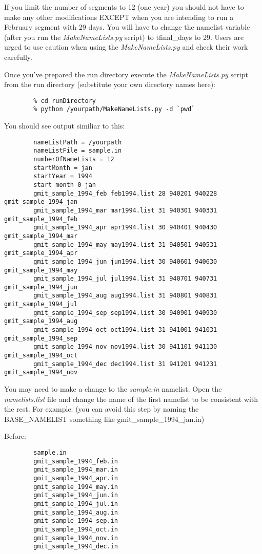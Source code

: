\begin{remark}
If you limit the number of segments to 12 (one year) you should not have to make any other
modifications EXCEPT when you are intending to run a February segment with 29 days. You will have to change the namelist variable (after you run
the {\em MakeNameLists.py} script) to tfinal\_days to 29.  Users are urged to use caution when using the {\em MakeNameLists.py} and check their work carefully.
\end{remark}

Once you've prepared the run directory execute the {\em MakeNameLists.py} script from the run directory (substitute your own directory names here):
\begin{verbatim}
        % cd runDirectory
        % python /yourpath/MakeNameLists.py -d `pwd`
\end{verbatim}

You should see output similiar to this:

\begin{verbatim}
        nameListPath = /yourpath
        nameListFile = sample.in
        numberOfNameLists = 12
        startMonth = jan
        startYear = 1994
        start month 0 jan
        gmit_sample_1994_feb feb1994.list 28 940201 940228 gmit_sample_1994_jan
        gmit_sample_1994_mar mar1994.list 31 940301 940331 gmit_sample_1994_feb
        gmit_sample_1994_apr apr1994.list 30 940401 940430 gmit_sample_1994_mar
        gmit_sample_1994_may may1994.list 31 940501 940531 gmit_sample_1994_apr
        gmit_sample_1994_jun jun1994.list 30 940601 940630 gmit_sample_1994_may
        gmit_sample_1994_jul jul1994.list 31 940701 940731 gmit_sample_1994_jun
        gmit_sample_1994_aug aug1994.list 31 940801 940831 gmit_sample_1994_jul
        gmit_sample_1994_sep sep1994.list 30 940901 940930 gmit_sample_1994_aug
        gmit_sample_1994_oct oct1994.list 31 941001 941031 gmit_sample_1994_sep
        gmit_sample_1994_nov nov1994.list 30 941101 941130 gmit_sample_1994_oct
        gmit_sample_1994_dec dec1994.list 31 941201 941231 gmit_sample_1994_nov
\end{verbatim}

You may need to make a change to the {\em sample.in} namelist.  
Open the {\em namelists.list} file and change the name of the first namelist to be consistent with the rest. For example:
(you can avoid this step by naming the BASE\_NAMELIST something like gmit\_sample\_1994\_jan.in)

Before:

\begin{verbatim}
        sample.in
        gmit_sample_1994_feb.in
        gmit_sample_1994_mar.in
        gmit_sample_1994_apr.in
        gmit_sample_1994_may.in
        gmit_sample_1994_jun.in
        gmit_sample_1994_jul.in 
        gmit_sample_1994_aug.in
        gmit_sample_1994_sep.in
        gmit_sample_1994_oct.in
        gmit_sample_1994_nov.in
        gmit_sample_1994_dec.in
\end{verbatim}

